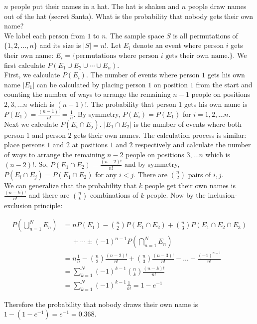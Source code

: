 \begin{texample}
	$n$ people put their names in a hat. The hat is shaken and $n$ people draw names out of the hat (secret Santa). What is the probability that nobody gets their own name? \\
	
	We label each person from $1$ to $n$. The sample space $S$ is all permutations of $\{1, 2, \dots, n\}$ and its size is $|S|=n!$. Let $E_i$ denote an event where person $i$ gets their own name: $E_i=\{ \text{permutations where person $i$ gets their own name.} \}$. We first calculate $P(E_1 \cup E_2 \cup \cdots \cup E_n)$. \\
	
	First, we calculate $P(E_i)$. The number of events where person $1$ gets his own name $|E_1|$ can be calculated by placing person $1$ on position $1$ from the start and counting the number of ways to arrange the remaining $n-1$ people on positions $2, 3, \dots n$ which is $(n-1)!$. The probability that person $1$ gets his own name is $P(E_1)=\frac{(n-1)!}{n!}=\frac{1}{n}$. By symmetry, $P(E_i)=P(E_1)$ for $i=1, 2, \dots n$. \\
	
	Next we calculate $P(E_i \cap E_j)$. $|E_1 \cap E_2|$ is the number of events where both person $1$ and person $2$ gets their own names. The calculation process is similar: place persons $1$ and $2$ at positions $1$ and $2$ respectively and calculate the number of ways to arrange the remaining $n-2$ people on positions $3, \dots n$ which is $(n-2)!$. So, $P(E_1 \cap E_2)=\frac{(n-2)!}{n!}$ and by symmetry, $P(E_i \cap E_j)=P(E_1 \cap E_2)$ for any $i<j$. There are $\binom{n}{2}$ pairs of $i,j$. \\
	
	We can generalize that the probability that $k$ people get their own names is $\frac{(n-k)!}{n!}$ and there are $\binom{n}{k}$ combinations of $k$ people. Now by the inclusion-exclusion principle:
	
	\begin{align*}
		P\left( \bigcup_{n=1}^N E_n \right) &= n P(E_1) - \binom{n}{2} P(E_1 \cap E_2) + \binom{n}{3} P(E_1 \cap E_2 \cap E_3) \\
		&\phantom{-} + \cdots \pm (-1)^{n-1} P\left( \bigcap_{n=1}^N E_n \right) \\
		&= n\frac{1}{n} - \binom{n}{2}\frac{(n-2)!}{n!} + \binom{n}{3}\frac{(n-3)!}{n!} - \dots + \frac{(-1)^{n-1}}{n!} \\
		&= \sum_{k=1}^N (-1)^{k-1}\binom{n}{k}\frac{(n-k)!}{n!} \\
		&= \sum_{k=1}^N (-1)^{k-1} \frac{1}{k!} = 1-e^{-1}
	\end{align*}
	
	Therefore the probability that nobody draws their own name is $1-(1-e^{-1})=e^{-1}=0.368$.
\end{texample}

